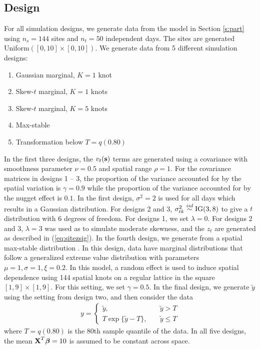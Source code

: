 \documentclass[11pt]{article}
\begin{document}
\subsection{Design}\label{s:simdesign}
For all simulation designs, we generate data from the model in Section \ref{s:part} using $n_s=144$ sites and $n_t=50$ independent days.
The sites are generated Uniform$([0, 10] \times [0, 10])$.
We generate data from 5 different simulation designs:
\begin{enumerate} \setlength{\itemsep}{-0.5em}
  \item Gaussian marginal, $K=1$ knot
  \item Skew-$t$ marginal, $K=1$ knots
  \item Skew-$t$ marginal, $K=5$ knots
  \item Max-stable
  \item Transformation below $T = q(0.80)$
\end{enumerate}
In the first three designs, the $v_t(\mbox{\bf s})$ terms are generated using a \Matern covariance with smoothness parameter $\nu = 0.5$ and spatial range $\rho = 1$.
For the covariance matrices in designs 1 -- 3, the proportion of the variance accounted for by the spatial variation is $\gamma = 0.9$ while the proportion of the variance accounted for by the nugget effect is $0.1$.
In the first design, $\sigma^2 = 2$ is used for all days which results in a Gaussian distribution.
For designs 2 and 3, $\sigma^2_{tk} \stackrel{iid}{\sim} \text{IG}(3, 8)$ to give a $t$ distribution with 6 degrees of freedom.
For designs 1, we set $\lambda = 0$.
For designs 2 and 3, $\lambda = 3$ was used as to simulate moderate skewness, and the $z_t$ are generated as described in (\ref{eq:sitezsig}).
In the fourth design, we generate from a spatial max-stable distribution \citep{Reich2012}.
In this design, data have marginal distributions that follow a generalized extreme value distribution with parameters $\mu = 1, \sigma=1, \xi=0.2$.
In this model, a random effect is used to induce spatial dependence using 144 spatial knots on a regular lattice in the square $[1, 9] \times [1, 9]$.
For this setting, we set $\gamma = 0.5$.
In the final design, we generate $\tilde{y}$ using the setting from design two, and then consider the data
\begin{align}
  y = \left\{ \begin{array}{lc}
    \tilde{y}, \quad & \tilde{y} > T \\[0.5em]
    T \exp\{\tilde{y} - T\}, \quad & \tilde{y} \le T
  \end{array}\right.
\end{align}
where $T = q(0.80)$ is the 80th sample quantile of the data.
In all five designs, the mean $\mbox{\bf X}^T \mbox{\boldmath $\beta$} = 10$ is assumed to be constant across space.
\end{document}
